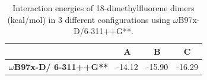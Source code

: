 \begin{table}[htbp]
	\caption{Interaction energies of 18-dimethylfluorene dimers (kcal/mol) in 3 different configurations using $\omega$B97x-D/6-311++G**.}
	\begin{center}
		\begin{tabular}{cccc}
			\toprule
			& \textbf{A} & \textbf{B} & \textbf{C} \\ 
			\midrule
			\textbf{$\omega$B97x-D/
				6-311++G** }& -14.12	& -15.90	& -16.29	\\ 
			\bottomrule
		\end{tabular}
	\end{center}
	\label{}
\end{table}
		
	
		
		
		
		
		
		
		
	
	
